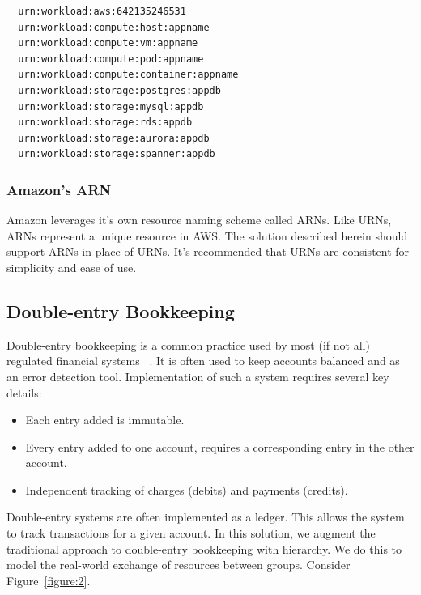 \documentclass[10pt, a4paper, twocolumn]{article}
\begin{document}
\begin{verbatim}
  urn:workload:aws:642135246531
  urn:workload:compute:host:appname
  urn:workload:compute:vm:appname
  urn:workload:compute:pod:appname
  urn:workload:compute:container:appname
  urn:workload:storage:postgres:appdb
  urn:workload:storage:mysql:appdb
  urn:workload:storage:rds:appdb
  urn:workload:storage:aurora:appdb
  urn:workload:storage:spanner:appdb
\end{verbatim}

    \subsubsection*{Amazon's ARN}
      Amazon leverages it's own resource naming scheme called ARNs.
      Like URNs, ARNs represent a unique resource in AWS.
      The solution described herein should support ARNs in place of URNs.
      It's recommended that URNs are consistent for simplicity and ease of use.

  \subsection*{Double-entry Bookkeeping}
    Double-entry bookkeeping is a common practice used by most (if not all) regulated financial systems ~\cite{doubleentry}.
    It is often used to keep accounts balanced and as an error detection tool.
    Implementation of such a system requires several key details:

    \begin{itemize}
      \item Each entry added is immutable.
      \item Every entry added to one account, requires a corresponding entry in the other account.
      \item Independent tracking of charges (debits) and payments (credits).
    \end{itemize}

    Double-entry systems are often implemented as a ledger.
    This allows the system to track transactions for a given account.
    In this solution, we augment the traditional approach to double-entry bookkeeping with hierarchy.
    We do this to model the real-world exchange of resources between groups.
    Consider Figure~\ref{figure:2}.
\end{document}
